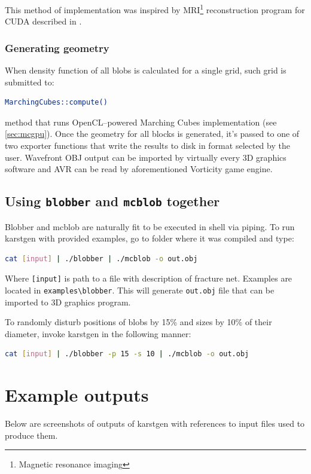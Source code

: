 This method of implementation was inspired by MRI\footnote{Magnetic resonance imaging}
reconstruction program for CUDA described in \cite[in chapter~8]{Kirk:2010:PMP:1841511}.

\subsubsection{Generating geometry}

When density function of all blobs is calculated for a single grid, such grid
is submitted to:
\begin{lstlisting}[language=bash,numbers=none]
MarchingCubes::compute()
\end{lstlisting}
method that runs OpenCL--powered
Marching Cubes implementation (see \autoref{sec:mcgpu}). Once the geometry for
all blocks is generated, it's passed to one of two exporter functions that write
the results to disk in format selected by the user. Wavefront OBJ output can be
imported by virtually every 3D graphics software and AVR can be read by aforementioned
Vorticity game engine.

\subsection{Using \texttt{blobber} and \texttt{mcblob} together}

Blobber and mcblob are naturally fit to be executed in shell via piping. To
run karstgen with provided examples, go to folder where it was compiled and
type:
\begin{lstlisting}[language=bash,numbers=none]
cat [input] | ./blobber | ./mcblob -o out.obj
\end{lstlisting}
Where \texttt{[input]} is path to a file with description of fracture net.
Examples are located in \texttt{examples\textbackslash blobber}.
This will generate \texttt{out.obj} file that can be imported to 3D graphics
program.
\pagebreak

To randomly disturb positions of blobs by 15\% and sizes by 10\% of their
diameter, invoke karstgen in the following manner:
\begin{lstlisting}[language=bash,numbers=none]
cat [input] | ./blobber -p 15 -s 10 | ./mcblob -o out.obj
\end{lstlisting}

\section{Example outputs}
Below are screenshots of outputs of karstgen with references to input files used
to produce them.

